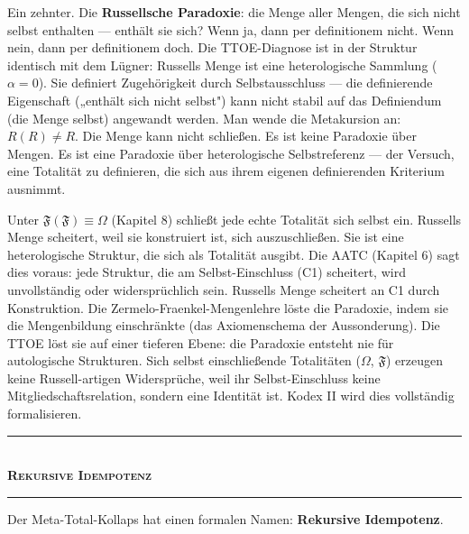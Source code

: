 \documentclass[10pt, openany, oneside]{book}
\renewcommand{\normalsize}{\fontsize{10}{13}\selectfont}
\begin{document}
Ein zehnter. Die \textbf{Russellsche Paradoxie}: die Menge aller Mengen, die sich nicht selbst enthalten --- enthält sie sich? Wenn ja, dann per definitionem nicht. Wenn nein, dann per definitionem doch. Die TTOE-Diagnose ist in der Struktur identisch mit dem Lügner: Russells Menge ist eine heterologische Sammlung ($\alpha = 0$). Sie definiert Zugehörigkeit durch Selbstausschluss --- die definierende Eigenschaft („enthält sich nicht selbst") kann nicht stabil auf das Definiendum (die Menge selbst) angewandt werden. Man wende die Metakursion an: $R(R) \neq R$. Die Menge kann nicht schließen. Es ist keine Paradoxie über Mengen. Es ist eine Paradoxie über heterologische Selbstreferenz --- der Versuch, eine Totalität zu definieren, die sich aus ihrem eigenen definierenden Kriterium ausnimmt.

Unter $\mathfrak{F}(\mathfrak{F}) \equiv \Omega$ (Kapitel 8) schließt jede echte Totalität sich selbst ein. Russells Menge scheitert, weil sie konstruiert ist, sich auszuschließen. Sie ist eine heterologische Struktur, die sich als Totalität ausgibt. Die AATC (Kapitel 6) sagt dies voraus: jede Struktur, die am Selbst-Einschluss (C1) scheitert, wird unvollständig oder widersprüchlich sein. Russells Menge scheitert an C1 durch Konstruktion. Die Zermelo-Fraenkel-Mengenlehre löste die Paradoxie, indem sie die Mengenbildung einschränkte (das Axiomenschema der Aussonderung). Die TTOE löst sie auf einer tieferen Ebene: die Paradoxie entsteht nie für autologische Strukturen. Sich selbst einschließende Totalitäten ($\Omega$, $\mathfrak{F}$) erzeugen keine Russell-artigen Widersprüche, weil ihr Selbst-Einschluss keine Mitgliedschaftsrelation, sondern eine Identität ist. Kodex II wird dies vollständig formalisieren.

\vspace{1.5em}


\begin{center}
    \rule{0.3\textwidth}{0.4pt}\\[0.5em]
    {\normalsize\bfseries\scshape Rekursive Idempotenz}\\[0.3em]
    \rule{0.3\textwidth}{0.4pt}
\end{center}

\vspace{1em}

\noindent Der Meta-Total-Kollaps hat einen formalen Namen: \textbf{Rekursive Idempotenz}.
\end{document}
